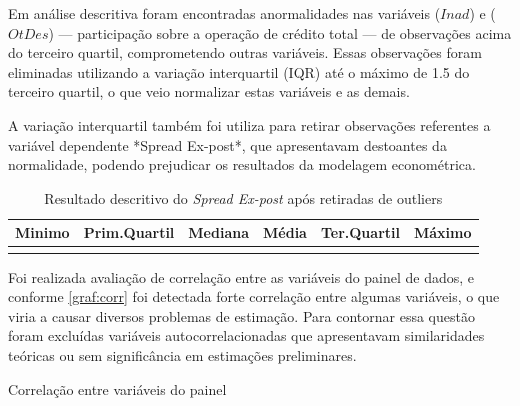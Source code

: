 \documentclass[
  12pt,
  12pt,
  openright,
  oneside,
  a4paper,
  chapter=TITLE,
  section=TITLE,
  subsection=TITLE,
  subsubsection=TITLE,
  portugues,
  sumario=tradicional]{abntex2}
\begin{document}
\begin{apendicesenv}
Em análise descritiva foram encontradas anormalidades nas variáveis ($Inad$) e ($OtDes$) — participação sobre a operação de crédito total — de observações acima do terceiro quartil, comprometendo outras variáveis. Essas observações foram eliminadas utilizando a variação interquartil (IQR) até o máximo de 1.5 do terceiro quartil, o que veio normalizar estas variáveis e as demais.

A variação interquartil também foi utiliza para retirar observações referentes a variável dependente *Spread Ex-post*, que apresentavam destoantes da normalidade, podendo prejudicar os resultados da modelagem econométrica. 

\begin{table}
\caption{Resultado descritivo do \emph{Spread Ex-post} após retiradas de outliers}
\vspace{1mm}
\begingroup\fontsize{10}{12}\selectfont

\begin{tabu} to 
\toprule
Minimo & Prim.Quartil & Mediana & Média & Ter.Quartil & Máximo\\
\midrule
{} &  &  &  &  & \\
\bottomrule
\end{tabu}
\endgroup{}
\vspace{1mm}
\label{tb:summspr}
\vspace{-2mm}
\end{table}

Foi realizada avaliação de correlação entre as variáveis do painel de dados, e conforme \autoref{graf:corr} foi detectada forte correlação entre algumas variáveis, o que viria a causar diversos problemas de estimação. Para contornar essa questão foram excluídas variáveis autocorrelacionadas que apresentavam similaridades teóricas ou sem significância em estimações preliminares.

\begin{grafico}[!htbp]
\vspace{20pt}
\caption{Correlação entre variáveis do painel}
\vspace{-4mm}


\end{grafico}
\end{apendicesenv}
\end{document}
